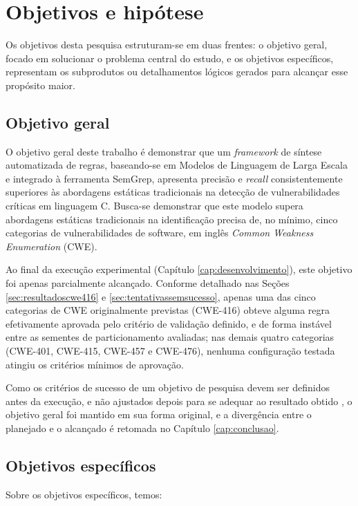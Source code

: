 \documentclass[
    12pt,                %
    openright,           %
    oneside,             %
    a4paper,             %
    english,             %
    brazil               %
]{abntex2}
\begin{document}
\section{Objetivos e hipótese}
\label{sec:objetivos}
\par
Os objetivos desta pesquisa estruturam-se em duas frentes: o objetivo geral, focado em solucionar o problema central do estudo, e os objetivos específicos, representam os subprodutos ou detalhamentos lógicos gerados para alcançar esse propósito maior.

\subsection{Objetivo geral}
\label{sec:objgeral}
\par
O objetivo geral deste trabalho é demonstrar que um \textit{framework} de síntese automatizada de regras, baseando-se em Modelos de Linguagem de Larga Escala e integrado à ferramenta SemGrep, apresenta precisão e \textit{recall} consistentemente superiores às abordagens estáticas tradicionais na detecção de vulnerabilidades críticas em linguagem C.
Busca-se demonstrar que este modelo supera abordagens estáticas tradicionais na identificação precisa de, no mínimo, cinco categorias de vulnerabilidades de software, em inglês \textit{Common Weakness Enumeration} (CWE).
\par
Ao final da execução experimental (Capítulo \ref{cap:desenvolvimento}), este objetivo foi apenas parcialmente alcançado.
Conforme detalhado nas Seções \ref{sec:resultadoscwe416} e \ref{sec:tentativassemsucesso}, apenas uma das cinco categorias de CWE originalmente previstas (CWE-416) obteve alguma regra efetivamente aprovada pelo critério de validação definido, e de forma instável entre as sementes de particionamento avaliadas; nas demais quatro categorias (CWE-401, CWE-415, CWE-457 e CWE-476), nenhuma configuração testada atingiu os critérios mínimos de aprovação.
\par
Como os critérios de sucesso de um objetivo de pesquisa devem ser definidos antes da execução, e não ajustados depois para se adequar ao resultado obtido \cite{Wazlawick2020}, o objetivo geral foi mantido em sua forma original, e a divergência entre o planejado e o alcançado é retomada no Capítulo \ref{cap:conclusao}.

\subsection{Objetivos específicos}
\label{sec:objespecifico}
\par
Sobre os objetivos específicos, temos:
\end{document}

